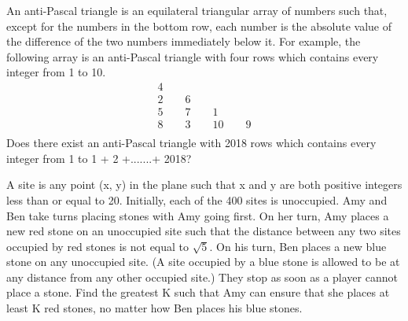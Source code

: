 \item An anti-Pascal triangle is an equilateral triangular array of numbers such that, except
for the numbers in the bottom row, each number is the absolute value of the difference of the two numbers immediately below it. For example, the following array is an anti-Pascal triangle with four rows which contains every integer from 1 to 10.
\begin{gather*}
  4 \\
  2 \qquad 6 \\
  5 \qquad 7 \qquad 1 \\ 
  8\qquad 3 \qquad 10 \qquad 9 \\ 
\end{gather*}
Does there exist an anti-Pascal triangle with 2018 rows which contains every integer from 1 to 1 + 2 +.......+ 2018?

\item A site is any point (x, y) in the plane such that x and y are both positive integers less than or equal to 20.
Initially, each of the 400 sites is unoccupied. Amy and Ben take turns placing stones with Amy going first. On her turn, Amy places a new red stone on an unoccupied site such that the distance between any two sites occupied by red stones is not equal to $\sqrt{5}$. On his turn, Ben places a new blue stone on any unoccupied site. (A site occupied by a blue stone is allowed to be at any distance from any other occupied site.) They stop as soon as a player cannot place a stone.
Find the greatest K such that Amy can ensure that she places at least K red stones, no matter
how Ben places his blue stones.

